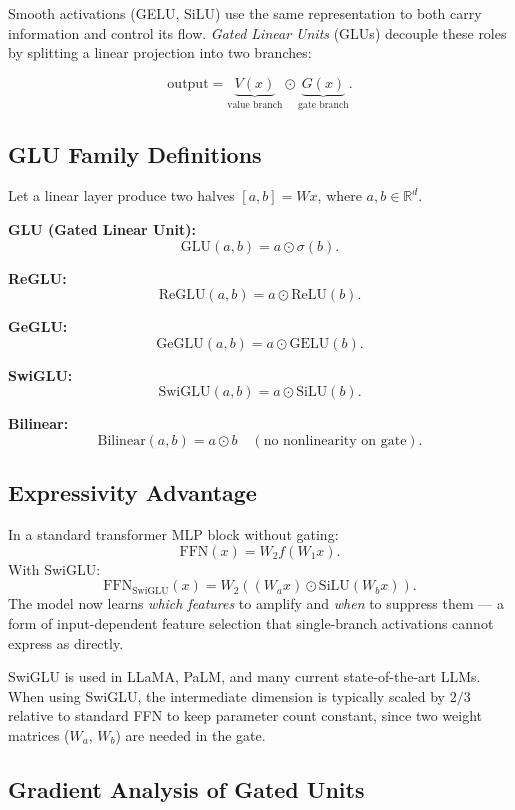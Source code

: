 \documentclass[12pt,a4paper]{article}
\theoremstyle{definition}
\theoremstyle{remark}
\newcommand{\R}{\mathbb{R}}
\begin{document}
Smooth activations (GELU, SiLU) use the same representation to both carry information and control its flow. \emph{Gated Linear Units} (GLUs) decouple these roles by splitting a linear projection into two branches:

\[
\text{output} = \underbrace{V(x)}_{\text{value branch}} \odot \underbrace{G(x)}_{\text{gate branch}}.
\]

\subsection{GLU Family Definitions}

Let a linear layer produce two halves $[a, b] = W x$, where $a,b \in \R^{d}$.

\vspace{6pt}
\noindent\textbf{GLU (Gated Linear Unit):}
\[
\mathrm{GLU}(a,b) = a \odot \sigma(b).
\]

\noindent\textbf{ReGLU:}
\[
\mathrm{ReGLU}(a,b) = a \odot \mathrm{ReLU}(b).
\]

\noindent\textbf{GeGLU:}
\[
\mathrm{GeGLU}(a,b) = a \odot \mathrm{GELU}(b).
\]

\noindent\textbf{SwiGLU:}
\[
\mathrm{SwiGLU}(a,b) = a \odot \mathrm{SiLU}(b).
\]

\noindent\textbf{Bilinear:}
\[
\mathrm{Bilinear}(a,b) = a \odot b \quad (\text{no nonlinearity on gate}).
\]

\subsection{Expressivity Advantage}

In a standard transformer MLP block without gating:
\[
\text{FFN}(x) = W_2 f(W_1 x).
\]
With SwiGLU:
\[
\text{FFN}_\text{SwiGLU}(x) = W_2\!\left( (W_a x) \odot \mathrm{SiLU}(W_b x) \right).
\]
The model now learns \emph{which features} to amplify and \emph{when} to suppress them — a form of input-dependent feature selection that single-branch activations cannot express as directly.

\begin{keybox}
SwiGLU is used in LLaMA, PaLM, and many current state-of-the-art LLMs. When using SwiGLU, the intermediate dimension is typically scaled by $2/3$ relative to standard FFN to keep parameter count constant, since two weight matrices ($W_a$, $W_b$) are needed in the gate.
\end{keybox}

\subsection{Gradient Analysis of Gated Units}
\end{document}

